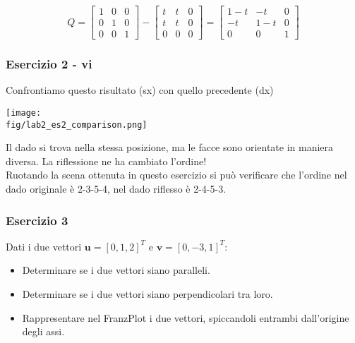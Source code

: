 \documentclass{beamer}
\newcommand{\fig}{figures} %
\newcommand{\frnzplt}{FranzPlot }
\begin{document}
\begin{frame}
\begin{displaymath}
Q =  \begin{bmatrix}
                1 & 0 & 0\\
                0  & 1 & 0\\
                0 & 0 & 1
                \end{bmatrix}
    -\begin{bmatrix}
                t & t & 0\\
                t & t & 0\\
                0 & 0 & 0
                \end{bmatrix}
 =  \begin{bmatrix}
                1 - t & -t & 0\\
                -t & 1 - t & 0\\
                0 & 0 & 1
                \end{bmatrix}
\end{displaymath}
\end{frame}

\begin{frame}
\frametitle{Esercizio 2 - vi}
    Confrontiamo questo risultato (sx) con quello precedente (dx)
    \begin{center}
\texttt{[image: \\fig/lab2\_es2\_comparison.png]}
    \end{center}
    Il dado si trova nella stessa posizione, ma le facce sono orientate
    in maniera diversa. La riflessione ne ha cambiato l'ordine! \\
    Ruotando la scena ottenuta in questo esercizio si pu\`o verificare che l'ordine nel dado originale \`e
    2-3-5-4, nel dado riflesso \`e 2-4-5-3.
\end{frame}

\begin{frame}
\frametitle{Esercizio 3}
        Dati i due vettori $\mathbf{u} = [0, 1, 2]^T$ e $\mathbf{v} = [0, -3, 1]^T$:
\begin{itemize}
    \item Determinare se i due vettori siano paralleli.
    \item Determinare se i due vettori siano perpendicolari tra loro.
    \item Rappresentare nel \frnzplt i due vettori, spiccandoli entrambi dall'origine degli assi.
\end{itemize}
\end{frame}
\end{document}

